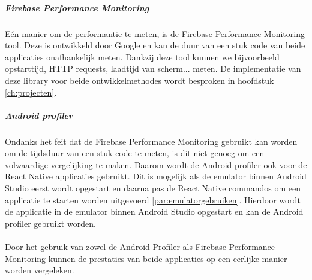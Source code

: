 \subparagraph{Firebase Performance Monitoring}
Eén manier om de performantie te meten, is de Firebase Performance Monitoring tool. 
Deze is ontwikkeld door Google en kan de duur van een stuk code van beide applicaties 
onafhankelijk meten. Dankzij deze tool kunnen we bijvoorbeeld opstarttijd, HTTP requests, 
laadtijd van scherm... meten. De implementatie van deze library voor beide ontwikkelmethodes wordt besproken 
in hoofdstuk \ref{ch:projecten}.

\subparagraph{Android profiler}
Ondanks het feit dat de Firebase Performance Monitoring gebruikt kan worden om de tijdsduur 
van een stuk code te meten, is dit niet genoeg om een volwaardige vergelijking te 
maken. Daarom wordt de Android profiler ook voor de React Native applicaties 
gebruikt. Dit is mogelijk als de emulator binnen Android Studio eerst wordt opgestart 
en daarna pas de React Native commandos om een applicatie te starten worden uitgevoerd 
\ref{par:emulatorgebruiken}. Hierdoor wordt de applicatie in de emulator 
binnen Android Studio opgestart en kan de Android profiler gebruikt worden. 
\\\\
Door het gebruik van zowel de Android Profiler als Firebase Performance Monitoring 
kunnen de prestaties van beide applicaties op een eerlijke manier worden vergeleken.
